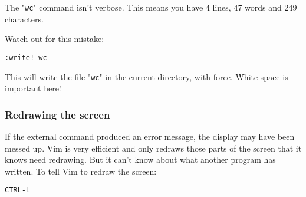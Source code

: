 The "\verb!wc!" command isn't verbose.
This means you have 4 lines, 47 words and 249 characters.

Watch out for this mistake:

\begin{Verbatim}[samepage=true]
 :write! wc
\end{Verbatim}

This will write the file "\verb!wc!" in the current directory, with force.
White space is important here!

\subsubsection{Redrawing the screen}
If the external command produced an error message, the display may have been messed up.
Vim is very efficient and only redraws those parts of the screen that it knows need redrawing.
But it can't know about what another program has written.
To tell Vim to redraw the screen:

\begin{Verbatim}[samepage=true]
 CTRL-L
\end{Verbatim}
\clearpage
